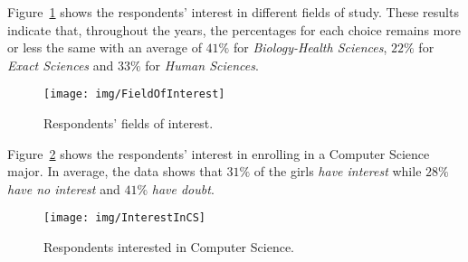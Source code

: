 Figure~\ref{fig:FieldOfInterest} shows the respondents' interest in different fields of study. These results indicate that, throughout the years, the percentages for each choice remains more or less the same with an average of $41\%$ for \emph{Biology-Health Sciences}, $22\%$ for \emph{Exact Sciences} and $33\%$ for \emph{Human Sciences}.

\begin{figure}[h!]%
\texttt{[image: img/FieldOfInterest]}%
\caption{Respondents' fields of interest.}%
\label{fig:FieldOfInterest}%
\end{figure}%

Figure~\ref{fig:InterestInCS} shows the respondents' interest in enrolling in a Computer Science major. In average, the data shows that $31\%$ of the girls \emph{have interest} while $28\%$ \emph{have no interest} and $41\%$ \emph{have doubt}.

\begin{figure}[h!]%
\texttt{[image: img/InterestInCS]}%
\caption{Respondents interested in Computer Science.}%
\label{fig:InterestInCS}%
\end{figure}%